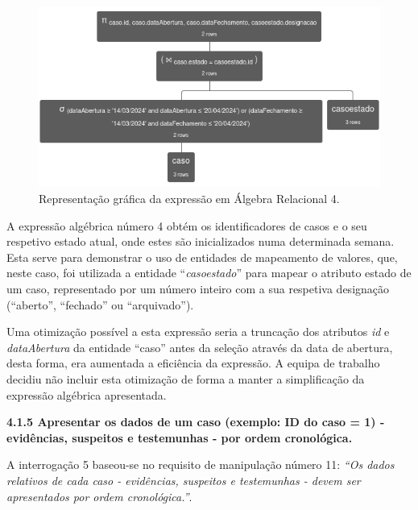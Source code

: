 \documentclass[a4paper,12pt]{scrreprt}
\begin{document}
\begin{figure}[!ht]
    \centering
    \includegraphics[scale=0.73]{images/relax/4.png}
    \caption{Representação gráfica da expressão em Álgebra Relacional 4.}
\end{figure}
\vspace{0.2cm}

A expressão algébrica número 4 obtém os identificadores de casos e o seu respetivo estado atual, onde estes são inicializados numa determinada semana. Esta serve para demonstrar o uso de entidades de mapeamento de valores, que, neste caso, foi utilizada a entidade “\textit{casoestado}” para mapear o atributo estado de um caso, representado por um número inteiro com a sua respetiva designação (“aberto”, “fechado” ou “arquivado”).

Uma otimização possível a esta expressão seria a truncação dos atributos \textit{id} e \textit{dataAbertura} da entidade “caso” antes da seleção através da data de abertura, desta forma, era aumentada a eficiência da expressão. A equipa de trabalho decidiu não incluir esta otimização de forma a manter a simplificação da expressão algébrica apresentada. 

\clearpage %
{\large\textbf{4.1.5 Apresentar os dados de um caso (exemplo: ID do caso = 1) - evidências, suspeitos e testemunhas - por ordem cronológica.}}

\vspace{0.2cm}

A interrogação 5 baseou-se no requisito de manipulação número 11: \textit{“Os dados relativos de cada caso - evidências, suspeitos e testemunhas - devem ser apresentados por ordem cronológica.”}.

\vspace{0.2cm}
\end{document}
